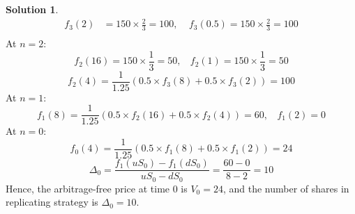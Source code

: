 \documentclass[a4paper, 10pt]{article}
\theoremstyle{definition}
\theoremstyle{hSol}
\newtheorem*{solution}{Solution}
\begin{document}
\begin{solution}
\begin{equation}
\begin{split}
    f_3(2) &= 150\times \frac{2}{3} = 100,~~~~~f_3(0.5) = 150\times \frac{2}{3} = 100 \\
  \end{split}
\end{equation}
At $n=2$:
$$
f_2(16) = 150\times \frac{1}{3} = 50,~~~~f_2(1) = 150\times \frac{1}{3} = 50
$$
$$
f_2(4) = \frac{1}{1.25}(0.5\times f_3(8)+0.5\times f_3(2)) = 100
$$
At $n=1$:
$$
f_1(8) = \frac{1}{1.25}(0.5\times f_2(16)+0.5\times f_2(4)) = 60,~~~~f_1(2)=0
$$
At $n=0$:
$$
f_0(4) =  \frac{1}{1.25}(0.5\times f_1(8)+0.5\times f_1(2)) = 24
$$
$$
\Delta_0 = \frac{f_1(uS_0)-f_1(dS_0)}{uS_0-dS_0} = \frac{60-0}{8-2} = 10
$$
Hence, the arbitrage-free price at time 0 is $V_0=24$, and the number of shares in replicating strategy is $\Delta_0=10$.
\end{solution}
\end{document}
